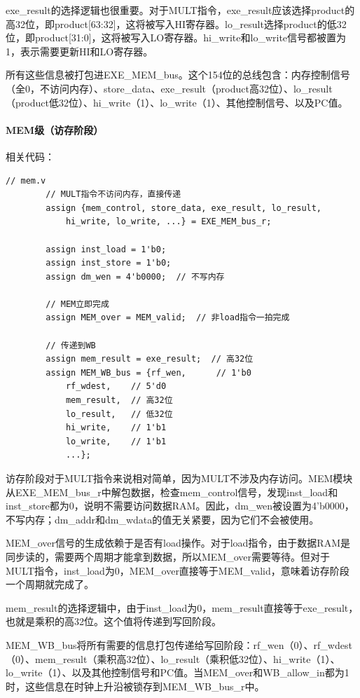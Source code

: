 \documentclass[a4paper]{article}
\begin{document}
	exe\_result的选择逻辑也很重要。对于MULT指令，exe\_result应该选择product的高32位，即product[63:32]，这将被写入HI寄存器。lo\_result选择product的低32位，即product[31:0]，这将被写入LO寄存器。hi\_write和lo\_write信号都被置为1，表示需要更新HI和LO寄存器。
	
	所有这些信息被打包进EXE\_MEM\_bus。这个154位的总线包含：内存控制信号（全0，不访问内存）、store\_data、exe\_result（product高32位）、lo\_result（product低32位）、hi\_write（1）、lo\_write（1）、其他控制信号、以及PC值。
	\paragraph{MEM级（访存阶段）}
	相关代码：
	\begin{lstlisting}[caption={MEM}]
		// mem.v
		// MULT指令不访问内存，直接传递
		assign {mem_control, store_data, exe_result, lo_result,
			hi_write, lo_write, ...} = EXE_MEM_bus_r;
		
		assign inst_load = 1'b0;
		assign inst_store = 1'b0;
		assign dm_wen = 4'b0000;  // 不写内存
		
		// MEM立即完成
		assign MEM_over = MEM_valid;  // 非load指令一拍完成
		
		// 传递到WB
		assign mem_result = exe_result;  // 高32位
		assign MEM_WB_bus = {rf_wen,      // 1'b0
			rf_wdest,    // 5'd0
			mem_result,  // 高32位
			lo_result,   // 低32位
			hi_write,    // 1'b1
			lo_write,    // 1'b1
			...};
	\end{lstlisting}
	
	访存阶段对于MULT指令来说相对简单，因为MULT不涉及内存访问。MEM模块从EXE\_MEM\_bus\_r中解包数据，检查mem\_control信号，发现inst\_load和inst\_store都为0，说明不需要访问数据RAM。因此，dm\_wen被设置为4'b0000，不写内存；dm\_addr和dm\_wdata的值无关紧要，因为它们不会被使用。
	
	MEM\_over信号的生成依赖于是否有load操作。对于load指令，由于数据RAM是同步读的，需要两个周期才能拿到数据，所以MEM\_over需要等待。但对于MULT指令，inst\_load为0，MEM\_over直接等于MEM\_valid，意味着访存阶段一个周期就完成了。
	
	mem\_result的选择逻辑中，由于inst\_load为0，mem\_result直接等于exe\_result，也就是乘积的高32位。这个值将传递到写回阶段。
	
	MEM\_WB\_bus将所有需要的信息打包传递给写回阶段：rf\_wen（0）、rf\_wdest（0）、mem\_result（乘积高32位）、lo\_result（乘积低32位）、hi\_write（1）、lo\_write（1）、以及其他控制信号和PC值。当MEM\_over和WB\_allow\_in都为1时，这些信息在时钟上升沿被锁存到MEM\_WB\_bus\_r中。
\end{document}
